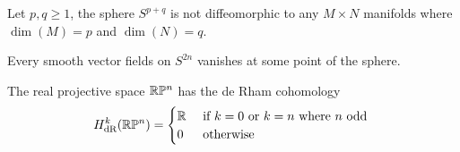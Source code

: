 \documentclass[a4paper]{article}
\begin{document}
\begin{thm}{}{} Let $p,q\geq 1$, the sphere $S^{p+q}$ is not diffeomorphic to any $M\times N$ manifolds where $\dim(M)=p$ and $\dim(N)=q$. 
\end{thm}

\begin{prp}{}{} Every smooth vector fields on $S^{2n}$ vanishes at some point of the sphere. 
\end{prp}

\begin{prp}{}{} The real projective space $\mathbb{R}\mathbb{P}^n$ has the de Rham cohomology $$H_{\text{dR}}^k(\mathbb{R}\mathbb{P}^n)=\begin{cases}
\mathbb{R} & \text{ if }k=0\text{ or }k=n\text{ where }n\text{ odd }\\
0 & \text{ otherwise }
\end{cases}$$
\end{prp}
\end{document}
